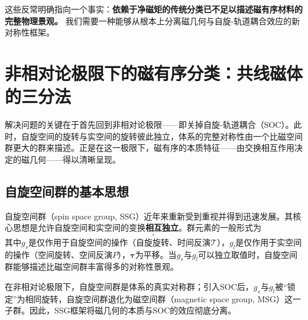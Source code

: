 这些反常明确指向一个事实：\textbf{依赖于净磁矩的传统分类已不足以描述磁有序材料的完整物理景观。} 我们需要一种能够从根本上分离磁几何与自旋-轨道耦合效应的新对称性框架。

\section{非相对论极限下的磁有序分类：共线磁体的三分法}

解决问题的关键在于首先回到非相对论极限——即关掉自旋-轨道耦合（SOC）。此时，自旋空间的旋转与实空间的旋转彼此独立，体系的完整对称性由一个比磁空间群更大的群来描述。正是在这一极限下，磁有序的本质特征——由交换相互作用决定的磁几何——得以清晰呈现。

\subsection{自旋空间群的基本思想}

自旋空间群（spin space group, SSG）近年来重新受到重视并得到迅速发展\cite{Smejkal2022PRX,Liu2022PRX,liu_symmetry_2026,jungwirth_symmetry_2026}。其核心思想是允许自旋空间和实空间的变换\textbf{相互独立}。群元素的一般形式为
\begin{equation}
[g_s \| g_l \| \boldsymbol{\tau}],
\end{equation}
其中$g_s$是仅作用于自旋空间的操作（自旋旋转、时间反演$\mathcal{T}$），$g_l$是仅作用于实空间的操作（空间旋转、空间反演$P$），$\boldsymbol{\tau}$为平移。当$g_s$与$g_l$可以独立取值时，自旋空间群能够描述比磁空间群丰富得多的对称性景观。

在非相对论极限下，自旋空间群是体系的真实对称群；引入SOC后，$g_s$与$g_l$被“锁定”为相同旋转，自旋空间群退化为磁空间群（magnetic space group, MSG）这一子群。因此，SSG框架将磁几何的本质与SOC的效应彻底分离。




